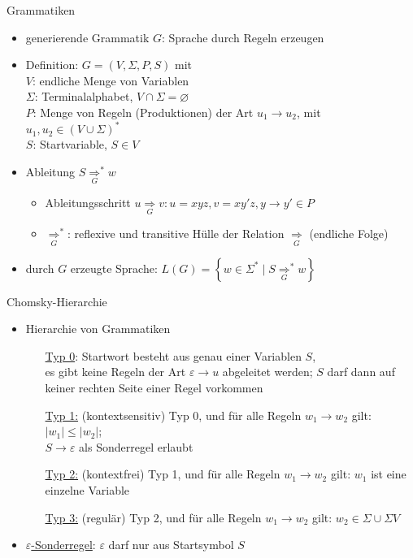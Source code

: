 \begin{frame}{Grammatiken}
	\begin{itemize}
		\item generierende Grammatik $G$: Sprache durch Regeln erzeugen
		\item Definition: $G=(V, \Sigma, P, S)$ mit\\
		$V$: endliche Menge von Variablen\\
		$\Sigma$: Terminalalphabet, $V \cap \Sigma = \varnothing$\\
		$P$: Menge von Regeln (Produktionen) der Art $u_1 \rightarrow u_2$, mit $u_1, u_2 \in \left(V \cup \Sigma\right)^*$\\
		$S$: Startvariable, $S \in V$
		\item Ableitung $S \underset{G}{\Rightarrow}^* w$
		\begin{itemize}
			\item Ableitungsschritt $u \underset{G}{\Rightarrow} v: u=xyz, v=xy'z, y\rightarrow y' \in P$
			\item $\underset{G}{\Rightarrow}^*$: reflexive und transitive Hülle der Relation $\underset{G}{\Rightarrow}$ (endliche Folge)
		\end{itemize}
		\item durch $G$ erzeugte Sprache: $L(G)=\left\{w \in \Sigma^* \mid S \underset{G}{\Rightarrow}^* w\right\}$
	\end{itemize}
\end{frame}

\begin{frame}{Chomsky-Hierarchie}
	\begin{itemize}
		\item Hierarchie von Grammatiken
		\begin{itemize}
			\item[\underline{Typ 0}:] Startwort besteht aus genau einer Variablen $S$,\\
			es gibt keine Regeln der Art $\varepsilon \rightarrow u$ abgeleitet werden; $S$ darf dann auf keiner rechten Seite einer Regel vorkommen
			\item[\underline{Typ 1:}] (kontextsensitiv) Typ 0, und für alle Regeln $w_1 \rightarrow w_2$ gilt: $|w_1| \leq |w_2|$;\\
			$S \rightarrow \varepsilon$ als Sonderregel erlaubt
			\item[\underline{Typ 2:}] (kontextfrei) Typ 1, und für alle Regeln $w_1 \rightarrow w_2$ gilt: $w_1$ ist eine einzelne Variable
			\item[\underline{Typ 3:}] (regulär) Typ 2, und für alle Regeln $w_1 \rightarrow w_2$ gilt: $w_2 \in \Sigma \cup \Sigma V$
		\end{itemize}
		\item \underline{$\varepsilon$-Sonderregel}: $\varepsilon$ darf nur aus Startsymbol $S$
	\end{itemize}
\end{frame}